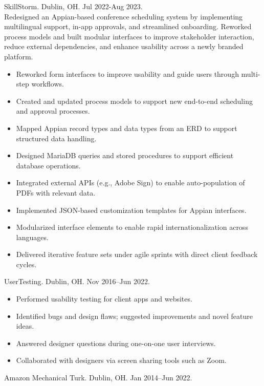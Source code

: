 \documentclass{article}
\begin{document}
\begin{description}
\begin{itemize}
  \end{itemize}
  \item[Appian Developer (Key Client: PwC)] SkillStorm. Dublin, OH. Jul 2022-Aug 2023. \\
  Redesigned an Appian-based conference scheduling system by implementing multilingual support, in-app approvals, and streamlined onboarding. Reworked process models and built modular interfaces to improve stakeholder interaction, reduce external dependencies, and enhance usability across a newly branded platform.
  \begin{itemize}
    \item Reworked form interfaces to improve usability and guide users through multi-step workflows.
    \item Created and updated process models to support new end-to-end scheduling and approval processes.
    \item Mapped Appian record types and data types from an ERD to support structured data handling.
    \item Designed MariaDB queries and stored procedures to support efficient database operations.
    \item Integrated external APIs (e.g., Adobe Sign) to enable auto-population of PDFs with relevant data.
    \item Implemented JSON-based customization templates for Appian interfaces.
    \item Modularized interface elements to enable rapid internationalization across languages.
    \item Delivered iterative feature sets under agile sprints with direct client feedback cycles.
  \end{itemize}
\item[Usability Tester] UserTesting. Dublin, OH. Nov 2016–Jun 2022.
\begin{itemize}
  \item Performed usability testing for client apps and websites.
  \item Identified bugs and design flaws; suggested improvements and novel feature ideas.
  \item Answered designer questions during one-on-one user interviews.
  \item Collaborated with designers via screen sharing tools such as Zoom.
\end{itemize}
\item[Crowd Worker] Amazon Mechanical Turk. Dublin, OH. Jan 2014–Jun 2022.
\begin{itemize}

\end{itemize}
\end{description}
\end{document}
